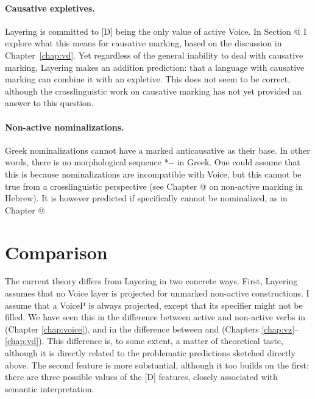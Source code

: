\paragraph*{Causative expletives.} Layering is committed to [D] being the only value of active Voice. In Section @ I explore what this means for causative marking, based on the discussion in Chapter~\ref{chap:vd}. Yet regardless of the general inability to deal with causative marking, Layering makes an addition prediction: that a language with causative marking can combine it with an expletive. This does not seem to be correct, although the crosslinguistic work on causative marking has not yet provided an answer to this question.

\paragraph*{Non-active nominalizations.} Greek nominalizations cannot have a marked anticausative as their base. In other words, there is no morphological sequence *-- in Greek. One could assume that this is because nominalizations are incompatible with Voice, but this cannot be true from a crosslinguistic perspective (see Chapter @ on non-active marking in Hebrew). It is however predicted if specifically {\vz} cannot be nominalized, as in Chapter @.


\section{Comparison}
The current theory differs from Layering in two concrete ways. First, Layering assumes that no Voice layer is projected for unmarked non-active constructions. I assume that a VoiceP is always projected, except that its specifier might not be filled. We have seen this in the difference between active and non-active verbs in {\tkal} (Chapter \ref{chap:voice}), and in the difference between {\vz} and {\vd} (Chapters \ref{chap:vz}--\ref{chap:vd}). This difference is, to some extent, a matter of theoretical taste, although it is directly related to the problematic predictions sketched directly above. The second feature is more substantial, although it too builds on the first: there are three possible values of the [D] features, closely associated with semantic interpretation.

